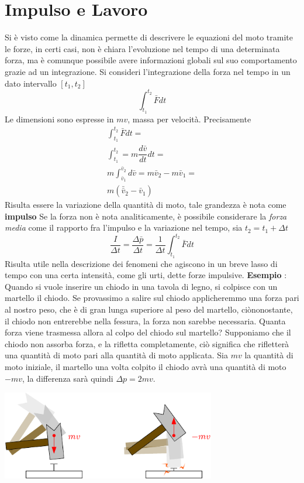 \documentclass[10pt, letterpaper]{report}
\begin{document}
\section{Impulso e Lavoro}
Si è visto come la dinamica permette di descrivere le equazioni 
del moto tramite le forze, in certi casi, non è chiara l'evoluzione 
nel tempo di una determinata forza, ma è comunque possibile 
avere informazioni globali sul suo comportamento grazie ad un
 integrazione. Si consideri l'integrazione della forza nel tempo in un dato 
 intervallo $[t_1,t_2]$
 $$ \int_{t_1}^{t_2}\bar F dt$$
 Le dimensioni sono espresse in $mv$, massa per velocità. Precisamente 
\begin{eqnarray}
    \int_{t_1}^{t_2}\bar Fdt =\\ 
    \int_{t_1}^{t_2} = m\dfrac{d\bar v}{dt}dt =\\ 
    m\int_{ \bar v_1}^{ \bar v_2}d\bar v = m\bar v_2-m\bar v_1=\\
    m(\bar \bar v_2-\bar v_1)
\end{eqnarray}
Risulta essere la variazione della quantità di moto, tale grandezza 
è nota come \textbf{impulso}
Se la forza non è nota analiticamente, è possibile 
considerare la \textit{forza media} come il rapporto fra l'impulso 
e la variazione nel tempo, sia $t_2=t_1+\Delta t$
$$ \frac{I}{\Delta t}=\frac{\Delta \bar p}{\Delta t}
=\frac{1}{\Delta t}\int_{t_1}^{t_2}\bar F dt$$
Risulta utile nella descrizione dei fenomeni che agiscono in 
un breve lasso di tempo con una certa intensità, come gli urti, dette 
forze impulsive.\acc 
\textbf{Esempio} : Quando si vuole inserire un chiodo in una tavola di legno, si colpisce 
con un martello il chiodo. Se provassimo a salire sul chiodo applicheremmo una forza pari al nostro peso, che è 
di gran lunga superiore al peso del martello, ciònonostante, il chiodo non entrerebbe nella fessura, la forza non sarebbe 
necessaria.\acc 
Quanta forza viene trasmessa allora al colpo del chiodo sul martello? Supponiamo che il chiodo non assorba 
forza, e la rifletta completamente, ciò significa che rifletterà una quantità di moto pari alla quantità 
di moto applicata. Sia $mv$ la quantità di moto iniziale, il martello una volta colpito il chiodo avrà una 
quantità di moto $-mv$, la differenza sarà quindi $\Delta p=2mv$.\begin{center}
    \includegraphics[width=0.7\textwidth]{images/chiodo.pdf} 
\end{center}
\end{document}
